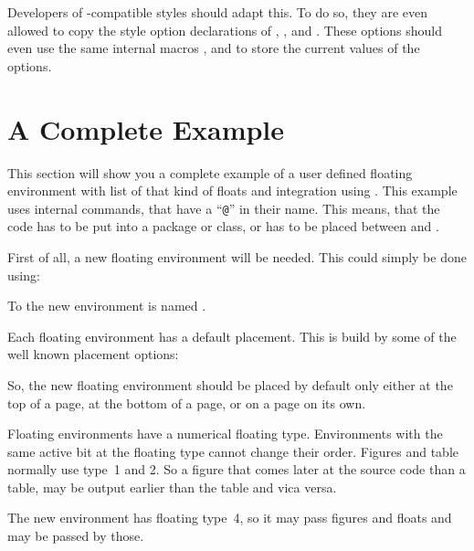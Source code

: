 Developers of -compatible styles should adapt this. To do so,
they are even allowed to copy the style option declarations of
, , and
. These options should even use the same internal
macros ,
 and
 to store the current
values of the options.%
%
%


\section{A Complete Example}

This section will show you a complete example of a user defined floating
environment with list of that kind of floats and \KOMAScript{} integration
using . This example uses internal commands, that have a
``\texttt{@}'' in their name. This means, that the code
has to be put into a package or class, or has to be placed between
%
 and .

First of all, a new floating environment will be
needed. This could simply be done using:
\begin{lstcode}[belowskip=\dp\strutbox plus 1pt]
  \newenvironment{remarkbox}{%
    \@float{remarkbox}%
  }{%
    \end@float
  }
\end{lstcode}
To the new environment is named .

Each floating environment has a default
placement. This is build by some of the well known placement options:
\begin{lstcode}[belowskip=\dp\strutbox plus 1pt]
  \newcommand*{\fps@remarkbox}{tbp}
\end{lstcode}
So, the new floating environment should be placed by default only either at
the top of a page, at the bottom of a page, or on a page on its own.

Floating environments have a numerical floating
type. Environments with the same active bit at the floating type cannot change
their order. Figures and table normally use type~1 and 2. So a figure that
comes later at the source code than a table, may be output earlier than the
table and vica versa.
\begin{lstcode}[belowskip=\dp\strutbox plus 1pt]
  \newcommand*{\ftype@remarkbox}{4}
\end{lstcode}
The new environment has floating type~4, so it may pass figures and floats and
may be passed by those.

